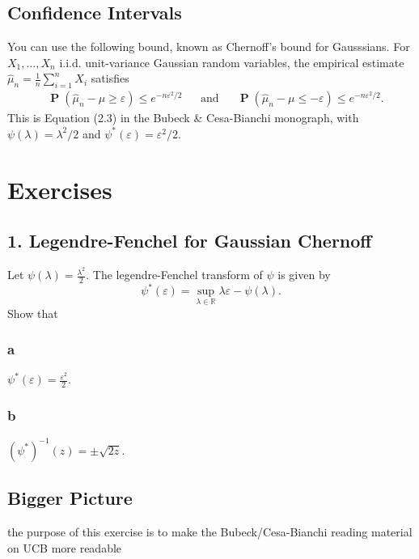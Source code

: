 \documentclass[10pt, a4paper, twoside]{amsart}
\theoremstyle{plain}
\newcommand{\R}{\ensuremath{\mathbb{R}}}
\def \P {{\mathbb P}}
\renewcommand{\P}{\operatorname*{\ensuremath{\mathbf{P}}}} %
\begin{document}
\subsection{Confidence Intervals}
You can use the following bound, known as Chernoff's bound for Gausssians.
For $X_1,\ldots ,X_n$ i.i.d. unit-variance Gaussian random variables, the empirical estimate $\hat{\mu}_n = \frac{1}{n} \sum _{i=1}^n X_i$ satisfies
\begin{align*}
    & \P(\hat{\mu}_n - \mu \geq \varepsilon) \leq e^{-n\varepsilon^2/2} && \mbox{and} && \P(\hat{\mu}_n - \mu \leq -\varepsilon) \leq e^{-n\varepsilon^2/2}.
\end{align*}
This is Equation (2.3) in the Bubeck \& Cesa-Bianchi monograph, with $\psi (\lambda) = \lambda^2/2$ and $\psi^* (\varepsilon) = \varepsilon^2/2$.
\section{Exercises}
\subsection*{1. Legendre-Fenchel for Gaussian Chernoff}
Let $\psi(\lambda) = \frac{\lambda^2}{2}$. The legendre-Fenchel transform of $\psi$ is given by
\begin{equation*}
    \psi^*(\varepsilon) = \sup_{\lambda \in \R}\lambda \varepsilon - \psi(\lambda).
\end{equation*}
Show that
\subsubsection*{a}
$\psi^*(\varepsilon) = \frac{\varepsilon^2}{2}$.
\subsubsection*{b}
$(\psi^*)^{-1}(z) = \pm \sqrt{2z}$.
\subsection*{Bigger Picture} the purpose of this exercise is to make the Bubeck/Cesa-Bianchi reading material on UCB more readable
\end{document}
